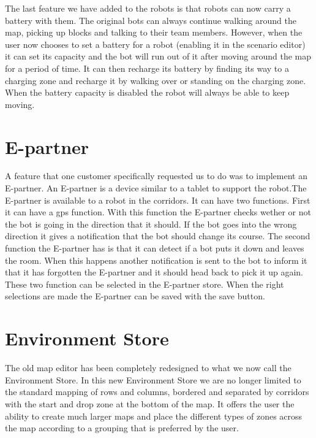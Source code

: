 The last feature we have added to the robots is that robots can now carry a battery with them. The original bots can always continue walking around the map, picking up blocks and talking to their team members. However, when the user now chooses to set a battery for a robot (enabling it in the scenario editor) it can set its capacity and the bot will run out of it after moving around the map for a period of time. It can then recharge its battery by finding its way to a charging zone and recharge it by walking over or standing on the charging zone. When the battery capacity is disabled the robot will always be able to keep moving.

\section{E-partner}
A feature that one customer specifically requested us to do was to implement an E-partner. An E-partner is a device similar to a tablet to support the robot.The E-partner is available to a robot in the corridors. It can have two functions. First it can have a gps function. With this function the E-partner checks wether or not the bot is going in the direction that it should. If the bot goes into the wrong direction it gives a notification that the bot should change its course. The second function the E-partner has is that it can detect if a bot puts it down and leaves the room. When this happens another notification is sent to the bot to inform it that it has forgotten the E-partner and it should head back to pick it up again. These two function can be selected in the E-partner store. When the right selections are made the E-partner can be saved with the save button.

\section{Environment Store}
The old map editor has been completely redesigned to what we now call the Environment Store. In this new Environment Store we are no longer limited to the standard mapping of rows and columns, bordered and separated by corridors with the start and drop zone at the bottom of the map. It offers the user the ability to create much larger maps and place the different types of zones across the map according to a grouping that is preferred by the user. \\

